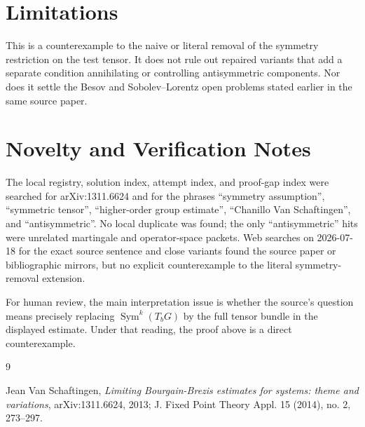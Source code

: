 \documentclass[11pt]{article}
\newcommand{\Sym}{\operatorname{Sym}}
\begin{document}
\section*{Limitations}

This is a counterexample to the naive or literal removal of the symmetry
restriction on the test tensor.  It does not rule out repaired variants that
add a separate condition annihilating or controlling antisymmetric components.
Nor does it settle the Besov and Sobolev--Lorentz open problems stated earlier
in the same source paper.

\section*{Novelty and Verification Notes}

The local registry, solution index, attempt index, and proof-gap index were
searched for arXiv:1311.6624 and for the phrases ``symmetry assumption'',
``symmetric tensor'', ``higher-order group estimate'', ``Chanillo Van
Schaftingen'', and ``antisymmetric''.  No local duplicate was found; the only
``antisymmetric'' hits were unrelated martingale and operator-space packets.
Web searches on 2026-07-18 for the exact source sentence and close variants
found the source paper or bibliographic mirrors, but no explicit counterexample
to the literal symmetry-removal extension.

For human review, the main interpretation issue is whether the source's
question means precisely replacing \(\Sym^k(T_bG)\) by the full tensor bundle
in the displayed estimate.  Under that reading, the proof above is a direct
counterexample.

\begin{thebibliography}{9}

Jean Van Schaftingen,
\emph{Limiting Bourgain-Brezis estimates for systems: theme and variations},
arXiv:1311.6624, 2013; J. Fixed Point Theory Appl. 15 (2014), no. 2,
273--297.

\end{thebibliography}
\end{document}

